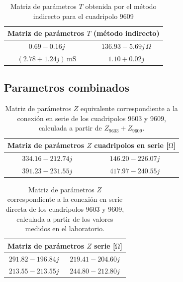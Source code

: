 \begin{table}[H]
\centering
\begin{tabular}{|c|c|}
\hline
\multicolumn{2}{|c|}{\textbf{Matriz de parámetros $T$ (método indirecto)}} \\ \hline
$0.69 - 0.16j$ & $136.93 - 5.69j\,\Omega$ \\ \hline
$(2.78 + 1.24j)\,\mathrm{mS}$ & $1.10 + 0.02j$ \\ \hline
\end{tabular}
\caption{Matriz de parámetros $T$ obtenida por el método indirecto para el cuadripolo 9609}
\label{tab:matriz_T9609_indirecta}
\end{table}

	\subsection*{Parametros combinados}
	
\begin{table}[H]
\centering
\begin{tabular}{|c|c|}
\hline
\multicolumn{2}{|c|}{\textbf{Matriz de parámetros $Z$ cuadripolos en serie [$\mathrm{\Omega}$]}} \\ \hline
$334.16 - 212.74j\,$ & $146.20 - 226.07j\,$ \\ \hline
$391.23 - 231.55j\,$ & $417.97 - 240.55j\,$ \\ \hline
\end{tabular}
\caption{Matriz de parámetros $Z$ equivalente correspondiente a la conexión en serie de los cuadripolos 9603 y 9609, calculada a partir de $Z_{9603} + Z_{9609}$.}
\label{tab:matriz_Z_serie_9603_9609}
\end{table}

\begin{table}[H]
\centering
\begin{tabular}{|c|c|}
\hline
\multicolumn{2}{|c|}{\textbf{Matriz de parámetros $Z$ serie [$\mathrm{\Omega}$]}} \\ \hline
$291.82 - 196.84j\,$ & $219.41 - 204.60j\,$ \\ \hline
$213.55 - 213.55j\,$ & $244.80 - 212.80j\,$ \\ \hline
\end{tabular}
\caption{Matriz de parámetros $Z$ correspondiente a la conexión en serie directa de los cuadripolos 9603 y 9609, calculada a partir de los valores medidos en el laboratorio.}
\label{tab:matriz_Z_serie_directa}
\end{table}

